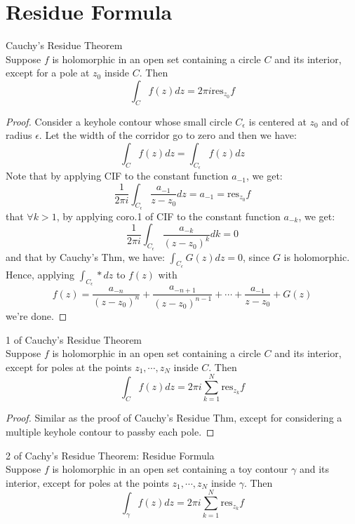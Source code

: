 \section{Residue Formula}

\begin{theorem}{Cauchy's Residue Theorem}\\
Suppose $f$ is holomorphic in an open set containing a circle $C$ and its interior, except for a pole at $z_0$ inside $C$. Then
\[
\int_C f(z)dz= 2\pi i\text{res}_{z_0}f
\]
\end{theorem}

\begin{proof}
    Consider a keyhole contour whose small circle $C_\epsilon$ is centered at $z_0$ and of radius $\epsilon$. Let the width of the corridor go to zero and then we have:
    \[
    \int_C f(z)dz= \int_{C_\epsilon} f(z)dz
    \]
    Note that by applying CIF to the constant function $a_{-1}$, we get:
    \[
    \frac{1}{2\pi i} \int_{C_\epsilon} \frac{a_{-1}}{z-z_0}dz=a_{-1} =\text{res}_{z_0}f
    \]
    that $\forall k>1$, by applying coro.1 of CIF to the constant function $a_{-k}$, we get:
    \[
    \frac{1}{2\pi i} \int_{C_\epsilon} \frac{a_{-k}}{(z-z_0)^k} dk=0
    \]
    and that by Cauchy's Thm, we have: $\int_{C_\epsilon} G(z)dz=0$, since $G$ is holomorphic. Hence, applying $\int_{C_\epsilon} * dz$ to $f(z)$ with
    \[
    f(z)= \frac{a_{-n}}{(z-z_0)^n} +\frac{a_{-n+1}}{(z-z_0)^{n-1}} +\cdots +\frac{a_{-1}}{z-z_0} +G(z)
    \]
    we're done.
\end{proof}

\begin{corollary}{1 of Cauchy's Residue Theorem}\\
Suppose $f$ is holomorphic in an open set containing a circle $C$ and its interior, except for poles at the points $z_1 ,\cdots, z_N$ inside $C$. Then
\[
\int_Cf(z)dz= 2\pi i\sum_{k=1}^N \text{res}_{z_k}f
\]
\end{corollary}

\begin{proof}
    Similar as the proof of Cauchy's Residue Thm, except for considering a multiple keyhole contour to passby each pole.
\end{proof}


\begin{corollary}{2 of Cachy's Residue Theorem: Residue Formula}\\
Suppose $f$ is holomorphic in an open set containing a toy contour $\gamma$ and its interior, except for poles at the points $z_1 ,\cdots, z_N$ inside $\gamma$. Then
\[
\int_\gamma f(z)dz= 2\pi i\sum_{k=1}^N \text{res}_{z_k}f
\]
\end{corollary}

